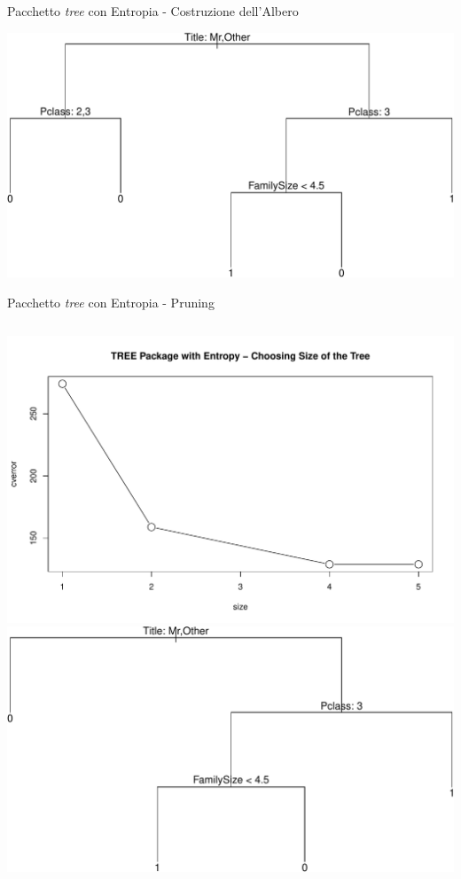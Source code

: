 \documentclass[9pt, xcolor=table]{beamer}
\begin{document}
	\begin{frame}{Pacchetto \textit{tree} con Entropia - Costruzione dell'Albero}
		
		
		\vfill
		
		\centering
		\includegraphics[scale=0.58]{tree-entropy-tree}

	\end{frame}

	\begin{frame}{Pacchetto \textit{tree} con Entropia - Pruning}
		
		
		\vfill
		
		\begin{columns}
			\centering
			\includegraphics[scale=0.26]{tree-entropy-size-plot}
			\centering
			\includegraphics[scale=0.3]{tree-entropy-pruned}
		\end{columns}	
	\end{frame}
\end{document}

